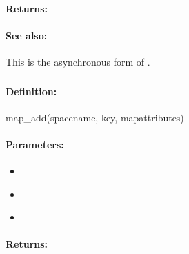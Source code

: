 \paragraph{Returns:}


\paragraph{See also:}  This is the asynchronous form of .

\pagebreak
\subsubsection{}
\label{api:ruby:map_add}


\paragraph{Definition:}
\begin{rubycode}
map_add(spacename, key, mapattributes)
\end{rubycode}

\paragraph{Parameters:}
\begin{itemize}[noitemsep]
\item {}\\

\item {}\\

\item {}\\

\end{itemize}

\paragraph{Returns:}


\pagebreak
\subsubsection{}
\label{api:ruby:async_map_add}


